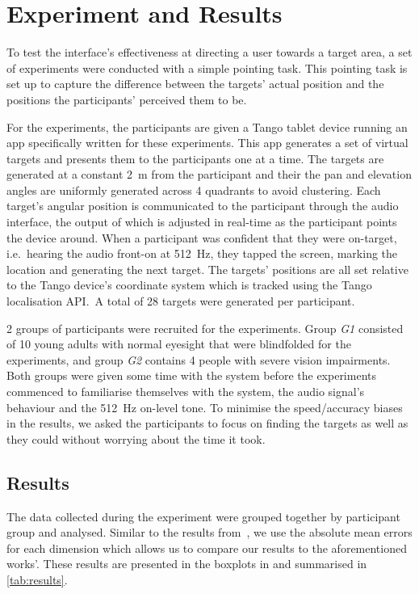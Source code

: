\documentclass{llncs}
\begin{document}
\section{Experiment and Results}

To test the interface's effectiveness at directing a user towards a target area, a set of experiments were conducted with a simple pointing task. 
This pointing task is set up to capture the difference between the targets' actual position and the positions the participants' perceived them to be.

For the experiments, the participants are given a Tango tablet device running an app specifically written for these experiments. 
This app generates a set of virtual targets and presents them to the participants one at a time. 
The targets are generated at a constant \SI{2}{\meter} from the participant and their the pan and elevation angles are uniformly generated across 4 quadrants to avoid clustering.
Each target's angular position is communicated to the participant through the audio interface, the output of which is adjusted in real-time as the participant points the device around. 
When a participant was confident that they were on-target, i.e.\ hearing the audio front-on at \SI{512}{\hertz}, they tapped the screen, marking the location and generating the next target.
The targets' positions are all set relative to the Tango device's coordinate system which is tracked using the Tango localisation API.\
A total of 28 targets were generated per participant. 

2 groups of participants were recruited for the experiments. 
Group \textit{G1} consisted of 10 young adults with normal eyesight that were blindfolded for the experiments, and group \textit{G2} contains 4 people with severe vision impairments. 
Both groups were given some time with the system before the experiments commenced to familiarise themselves with the system, the audio signal's behaviour and the \SI{512}{\hertz} on-level tone. 
To minimise the speed/accuracy biases in the results, we asked the participants to focus on finding the targets as well as they could without worrying about the time it took.  

\subsection{Results}

The data collected during the experiment were grouped together by participant group and analysed.
Similar to the results from~\cite{macdonald2006spatial,schonstein2008comparison}, we use the absolute mean errors for each dimension which allows us to compare our results to the aforementioned works'. 
These results are presented in the boxplots in \crefrange{fig:sighted-err}{fig:blind-err} and summarised in \cref{tab:results}.
\end{document}
